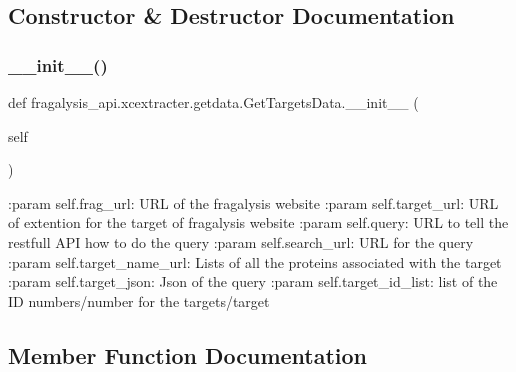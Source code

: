 \subsection{Constructor \& Destructor Documentation}
\mbox{\label{classfragalysis__api_1_1xcextracter_1_1getdata_1_1_get_targets_data_a40260f1d84f75c354f8b1b7124732b3a}} 
\subsubsection{\texorpdfstring{\+\_\+\+\_\+init\+\_\+\+\_\+()}{\_\_init\_\_()}}
{\footnotesize\ttfamily def fragalysis\+\_\+api.\+xcextracter.\+getdata.\+Get\+Targets\+Data.\+\_\+\+\_\+init\+\_\+\+\_\+ (\begin{DoxyParamCaption}\item[{}]{self }\end{DoxyParamCaption})}

\begin{DoxyVerb}:param self.frag_url: URL of the fragalysis website
:param self.target_url: URL of extention for the target of fragalysis website
:param self.query: URL to tell the restfull API how to do the query
:param self.search_url: URL for the query 
:param self.target_name_url: Lists of all the proteins associated with the target
:param self.target_json: Json of the query
:param self.target_id_list: list of the ID numbers/number for the targets/target
\end{DoxyVerb}
 

\subsection{Member Function Documentation}
\mbox{\label{classfragalysis__api_1_1xcextracter_1_1getdata_1_1_get_targets_data_af26e1f97fa431c2bb490985e7af0eb45}} 

